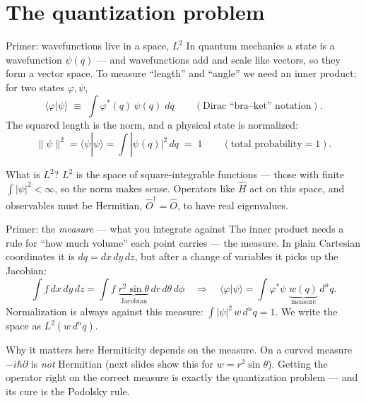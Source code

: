 \documentclass[aspectratio=169,10pt]{beamer}
\newcommand{\stagenum}{0}
\newcommand{\setstage}[1]{\renewcommand{\stagenum}{#1}}
\begin{document}
\setstage{3}
\section{The quantization problem}

\begin{frame}{Primer: wavefunctions live in a space, $L^2$}
\setstage{3}
In quantum mechanics a state is a \alert{wavefunction} $\psi(q)$ --- and wavefunctions add and scale like vectors, so they form a vector space. To measure ``length'' and ``angle'' we need an \alert{inner product}; for two states $\varphi,\psi$,
\begin{equation*}
\langle\varphi|\psi\rangle \;\equiv\; \int \varphi^{*}(q)\,\psi(q)\;dq
\qquad(\text{Dirac ``bra--ket'' notation}).
\end{equation*}
The squared length is the \alert{norm}, and a physical state is \alert{normalized}:
\begin{equation*}
\|\psi\|^2=\langle\psi|\psi\rangle=\int|\psi(q)|^2\,dq \;=\;1
\qquad(\text{total probability}=1).
\end{equation*}
\begin{block}{What is $L^2$?}
$L^2$ is the space of \alert{square-integrable} functions --- those with finite $\int|\psi|^2<\infty$, so the norm makes sense. Operators like $\hat H$ act on this space, and observables must be \alert{Hermitian}, $\hat O^{\dagger}=\hat O$, to have real eigenvalues.
\end{block}
\end{frame}

\begin{frame}{Primer: the \emph{measure} --- what you integrate against}
\setstage{3}
The inner product needs a rule for ``how much volume'' each point carries --- the \alert{measure}. In plain Cartesian coordinates it is $dq=dx\,dy\,dz$, but after a change of variables it picks up the \alert{Jacobian}:
\begin{equation*}
\int f\,dx\,dy\,dz=\int f\;\underbrace{r^2\sin\theta}_{\text{Jacobian}}\,dr\,d\theta\,d\phi
\quad\Longrightarrow\quad
\langle\varphi|\psi\rangle=\int\varphi^{*}\psi\;\underbrace{w(q)}_{\text{measure}}\,d^nq .
\end{equation*}
Normalization is always against this measure: $\int|\psi|^2\,w\,d^nq=1$. We write the space as $L^2(w\,d^nq)$.
\begin{alertblock}{Why it matters here}
\alert{Hermiticity depends on the measure.} On a curved measure $-i\hbar\partial$ is \emph{not} Hermitian (next slides show this for $w=r^2\sin\theta$). Getting the operator right on the correct measure is exactly the quantization problem --- and its cure is the Podolsky rule.
\end{alertblock}
\end{frame}
\end{document}
